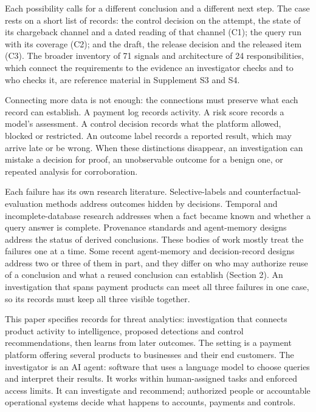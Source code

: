 \documentclass[acmlarge,review,anonymous,nonacm]{acmart}
\begin{document}
\endgroup

Each possibility calls for a different conclusion and a different next
step. The case rests on a short list of records: the control decision on
the attempt, the state of its chargeback channel and a dated reading of
that channel (C1); the query run with its coverage (C2); and the draft,
the release decision and the released item (C3). The broader inventory
of 71 signals and architecture of 24 responsibilities, which connect the
requirements to the evidence an investigator checks and to who checks
it, are reference material in Supplement S3 and S4.

Connecting more data is not enough: the connections must preserve what
each record can establish. A payment log records activity. A risk score
records a model's assessment. A control decision records what the
platform allowed, blocked or restricted. An outcome label records a
reported result, which may arrive late or be wrong. When these
distinctions disappear, an investigation can mistake a decision for
proof, an unobservable outcome for a benign one, or repeated analysis
for corroboration.

Each failure has its own research literature. Selective-labels and
counterfactual-evaluation methods address outcomes hidden by decisions.
Temporal and incomplete-database research addresses when a fact became
known and whether a query answer is complete. Provenance standards and
agent-memory designs address the status of derived conclusions. These
bodies of work mostly treat the failures one at a time. Some recent
agent-memory and decision-record designs address two or three of them in
part, and they differ on who may authorize reuse of a conclusion and
what a reused conclusion can establish (Section 2). An investigation
that spans payment products can meet all three failures in one case, so
its records must keep all three visible together.

This paper specifies records for threat analytics: investigation that
connects product activity to intelligence, proposed detections and
control recommendations, then learns from later outcomes. The setting is
a payment platform offering several products to businesses and their end
customers. The investigator is an AI agent: software that uses a
language model to choose queries and interpret their results. It works
within human-assigned tasks and enforced access limits. It can
investigate and recommend; authorized people or accountable operational
systems decide what happens to accounts, payments and controls.
\end{document}

